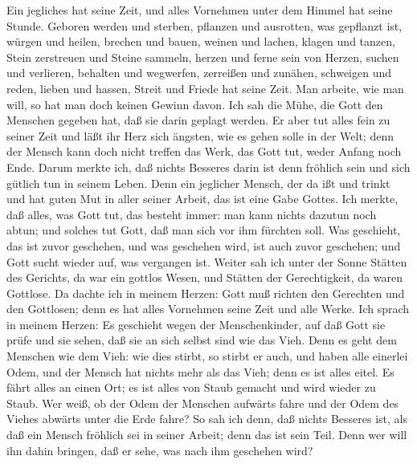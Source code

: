  Ein jegliches hat seine Zeit, und alles Vornehmen unter dem
Himmel hat seine Stunde.  Geboren werden und sterben,
pflanzen und ausrotten, was gepflanzt ist,  würgen und
heilen, brechen und bauen,  weinen und lachen, klagen und
tanzen,  Stein zerstreuen und Steine sammeln, herzen und
ferne sein von Herzen,  suchen und verlieren, behalten und
wegwerfen,  zerreißen und zunähen, schweigen und reden,
 lieben und hassen, Streit und Friede hat seine Zeit.
 Man arbeite, wie man will, so hat man doch keinen Gewinn
davon.  Ich sah die Mühe, die Gott den Menschen gegeben
hat, daß sie darin geplagt werden.  Er aber tut alles fein
zu seiner Zeit und läßt ihr Herz sich ängsten, wie es gehen solle in der
Welt; denn der Mensch kann doch nicht treffen das Werk, das Gott tut,
weder Anfang noch Ende.  Darum merkte ich, daß nichts
Besseres darin ist denn fröhlich sein und sich gütlich tun in seinem
Leben.  Denn ein jeglicher Mensch, der da ißt und trinkt
und hat guten Mut in aller seiner Arbeit, das ist eine Gabe Gottes.
 Ich merkte, daß alles, was Gott tut, das besteht immer:
man kann nichts dazutun noch abtun; und solches tut Gott, daß man sich
vor ihm fürchten soll.  Was geschieht, das ist zuvor
geschehen, und was geschehen wird, ist auch zuvor geschehen; und Gott
sucht wieder auf, was vergangen ist.  Weiter sah ich unter
der Sonne Stätten des Gerichts, da war ein gottlos Wesen, und Stätten
der Gerechtigkeit, da waren Gottlose.  Da dachte ich in
meinem Herzen: Gott muß richten den Gerechten und den Gottlosen; denn es
hat alles Vornehmen seine Zeit und alle Werke.  Ich sprach
in meinem Herzen: Es geschieht wegen der Menschenkinder, auf daß Gott
sie prüfe und sie sehen, daß sie an sich selbst sind wie das Vieh.
 Denn es geht dem Menschen wie dem Vieh: wie dies stirbt,
so stirbt er auch, und haben alle einerlei Odem, und der Mensch hat
nichts mehr als das Vieh; denn es ist alles eitel.  Es
fährt alles an einen Ort; es ist alles von Staub gemacht und wird wieder
zu Staub.  Wer weiß, ob der Odem der Menschen aufwärts
fahre und der Odem des Viehes abwärts unter die Erde fahre?
 So sah ich denn, daß nichts Besseres ist, als daß ein
Mensch fröhlich sei in seiner Arbeit; denn das ist sein Teil. Denn wer
will ihn dahin bringen, daß er sehe, was nach ihm geschehen wird?

